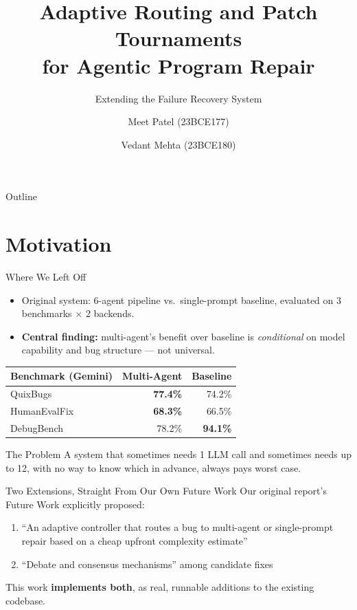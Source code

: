 \documentclass[aspectratio=169]{beamer}
\title[Adaptive Routing \& Patch Tournaments]{Adaptive Routing and Patch Tournaments\\for Agentic Program Repair}
\subtitle{Extending the Failure Recovery System}
\author{Meet Patel (23BCE177) \and Vedant Mehta (23BCE180)}
\institute[Nirma University]{School of Technology, Institute of Technology, Nirma University, Ahmedabad\\[4pt]\textit{Guide: Mr. AjayKumar Patel}}
\date{}
\begin{document}
\begin{frame}
\titlepage
\end{frame}

\begin{frame}{Outline}
\tableofcontents
\end{frame}

\section{Motivation}
\begin{frame}{Where We Left Off}
\begin{itemize}
    \item Original system: 6-agent pipeline vs.\ single-prompt baseline, evaluated on 3 benchmarks $\times$ 2 backends.
    \item \textbf{Central finding:} multi-agent's benefit over baseline is \emph{conditional} on model capability and bug structure --- not universal.
\end{itemize}
\begin{table}
\centering\small
\begin{tabular}{@{}lrr@{}}
\toprule
Benchmark (Gemini) & Multi-Agent & Baseline \\
\midrule
QuixBugs     & \textbf{77.4\%} & 74.2\% \\
HumanEvalFix & \textbf{68.3\%} & 66.5\% \\
DebugBench   & 78.2\% & \textbf{94.1\%} \\
\bottomrule
\end{tabular}
\end{table}
\begin{block}{The Problem}
A system that sometimes needs 1 LLM call and sometimes needs up to 12, with no way to know which in advance, always pays worst case.
\end{block}
\end{frame}

\begin{frame}{Two Extensions, Straight From Our Own Future Work}
Our original report's Future Work explicitly proposed:
\begin{enumerate}
    \item ``An adaptive controller that routes a bug to multi-agent or single-prompt repair based on a cheap upfront complexity estimate''
    \item ``Debate and consensus mechanisms'' among candidate fixes
\end{enumerate}
\vspace{8pt}
This work \textbf{implements both}, as real, runnable additions to the existing codebase.
\end{frame}
\end{document}

